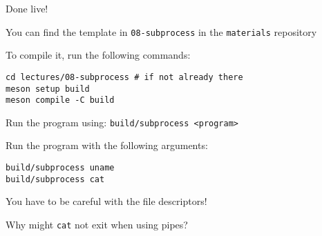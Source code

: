   \begin{slide}


    Done live!
    \medskip

    You can find the template in \texttt{08-subprocess} in the \texttt{materials}
    repository
    \medskip

    To compile it, run the following commands:
    \medskip

    \begin{verbatim}
cd lectures/08-subprocess # if not already there
meson setup build
meson compile -C build
    \end{verbatim}
    \medskip

    Run the program using: \texttt{build/subprocess <program>}

  \end{slide}

  \begin{slide}


    Run the program with the following arguments:
    \medskip

    \begin{verbatim}
build/subprocess uname
build/subprocess cat
    \end{verbatim}
    \medskip

    You have to be careful with the file descriptors!
    \medskip

    Why might \texttt{cat} not exit when using pipes?
  \end{slide}


